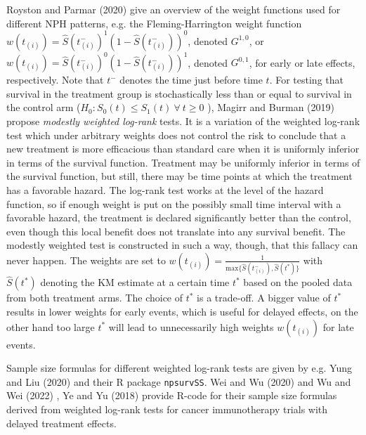 \noindent Royston and Parmar (2020) \cite{Royston.2020} give an overview of the weight functions used for different NPH patterns, e.g. the Fleming-Harrington weight function $w(t_{(i)})=\hat{S}{\left(t^{-}_{(i)}\right)}^1{\left(1-\hat{S}\left(t^{-}_{(i)}\right)\right)}^0$, denoted $G^{1,0}$, or $w(t_{(i)})=\hat{S}{\left(t^{-}_{(i)}\right)}^0{\left(1-\hat{S}\left(t^-_{(i)}\right)\right)}^1$, denoted $G^{0,1}$, for early or late effects, respectively. Note that $t^{-}$ denotes the time just before time $t$. For testing that survival in the treatment group is stochastically less than or equal to survival in the control arm ($H_0:S_0\left(t\right)\le S_1\left(t\right)\ \forall \ t\ge 0$  ), Magirr and Burman (2019) \cite{Magirr.2019} propose \textit{modestly weighted log-rank} tests. It is a variation of the weighted log-rank test which under arbitrary weights does not control the risk to conclude that a new treatment is more efficacious than standard care when it is uniformly inferior in terms of the survival function. Treatment may be uniformly inferior in terms of the survival function, but still, there may be time points at which the treatment has a favorable hazard. The log-rank test works at the level of the hazard function, so if enough weight is put on the possibly small time interval with a favorable hazard, the treatment is declared significantly better than the control, even though this local benefit does not translate into any survival benefit. The modestly weighted test is constructed in such a way, though, that this fallacy can never happen. The weights are set to $w(t_{(i)})=\frac{1}{\mathrm{max}\mathrm{}\{\hat{S}\left(t^{-}_{(i)}\right),\hat{S}\left(t^*\right)\}}$ with ~$\hat{S}\left(t^*\right)$ denoting the KM estimate at a certain time $t^*$ based on the pooled data from both treatment arms. The choice of $t^*$ is a trade-off. A bigger value of $t^*$ results in lower weights for early events, which is useful for delayed effects, on the other hand too large $t^*$ will lead to unnecessarily high weights $w(t_{(i)})$ for late events.

\noindent 

\noindent Sample size formulas for different weighted log-rank tests are given by e.g. Yung and Liu (2020) \cite{Yung.2020} and their R package \texttt{npsurvSS}. Wei and Wu (2020) \cite{Wei.2020} and Wu and Wei (2022) \cite{Wu.2022}, Ye and Yu (2018) \cite{Ye.2018} provide R-code for their sample size formulas derived from weighted log-rank tests for cancer immunotherapy trials with delayed treatment effects.

